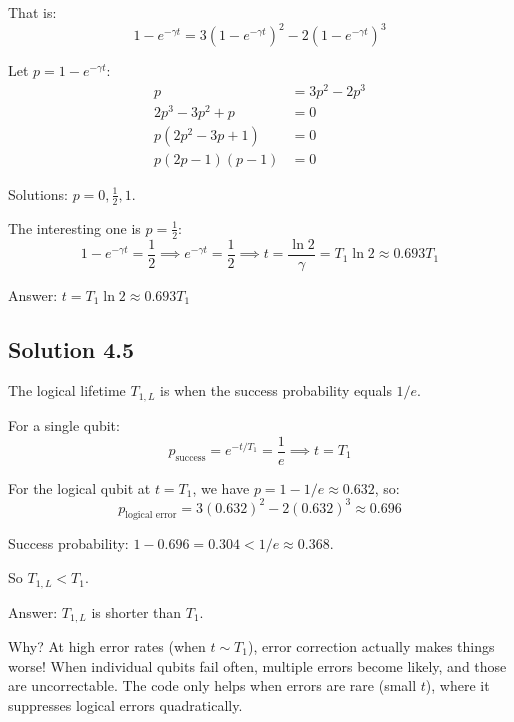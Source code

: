\documentclass[11pt]{article}
\begin{document}
That is:
\begin{equation*}
    1 - e^{-\gamma t} = 3(1-e^{-\gamma t})^2 - 2(1-e^{-\gamma t})^3
\end{equation*}

Let $p = 1 - e^{-\gamma t}$:
\begin{align*}
    p &= 3p^2 - 2p^3 \\
    2p^3 - 3p^2 + p &= 0 \\
    p(2p^2 - 3p + 1) &= 0 \\
    p(2p-1)(p-1) &= 0
\end{align*}

Solutions: $p = 0, \frac{1}{2}, 1$.

The interesting one is $p = \frac{1}{2}$:
\begin{equation*}
    1 - e^{-\gamma t} = \frac{1}{2} \implies e^{-\gamma t} = \frac{1}{2} \implies t = \frac{\ln 2}{\gamma} = T_1 \ln 2 \approx 0.693 T_1
\end{equation*}

Answer: $t = T_1 \ln 2 \approx 0.693 T_1$

\subsection{Solution 4.5}

The logical lifetime $T_{1,L}$ is when the success probability equals $1/e$.

For a single qubit:
\begin{equation*}
    p_{\text{success}} = e^{-t/T_1} = \frac{1}{e} \implies t = T_1
\end{equation*}

For the logical qubit at $t = T_1$, we have $p = 1 - 1/e \approx 0.632$, so:
\begin{equation*}
    p_{\text{logical error}} = 3(0.632)^2 - 2(0.632)^3 \approx 0.696
\end{equation*}

Success probability: $1 - 0.696 = 0.304 < 1/e \approx 0.368$.

So $T_{1,L} < T_1$.

Answer: $T_{1,L}$ is shorter than $T_1$.

Why? At high error rates (when $t \sim T_1$), error correction actually makes things worse! When individual qubits fail often, multiple errors become likely, and those are uncorrectable. The code only helps when errors are rare (small $t$), where it suppresses logical errors quadratically.
\end{document}

